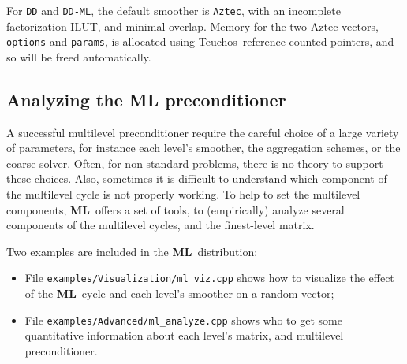 \documentclass{article}[11pt]
\newcommand{\ML}     {{\bf ML}}
\newcommand{\teuchos}  {{\sc Teuchos}}
\begin{document}
For {\tt DD} and {\tt DD-ML}, the default smoother is {\tt Aztec},
with an incomplete factorization ILUT, and minimal overlap. 
Memory for the two {\sc Aztec} vectors, {\tt options} and {\tt params},
is allocated using \teuchos\
reference-counted pointers, and so will be freed automatically.
%


\subsection{Analyzing the ML preconditioner}
\label{sec:MLP:analyze}

A successful multilevel preconditioner require the careful choice
of a large variety of parameters, for instance 
each level's smoother, the aggregation schemes, or the coarse solver.
Often, for non-standard problems, there is no theory to support these choices.
Also, sometimes it is difficult to understand which component of the
multilevel cycle is not properly working. To help to set the multilevel
components, \ML~offers a set of tools, to (empirically)
analyze several components of the multilevel cycles, and the finest-level
matrix.

Two examples are included in the \ML~distribution:
\begin{itemize}
\item File \verb!examples/Visualization/ml_viz.cpp! shows how to
visualize the effect of the \ML~cycle and each level's smoother on a random vector;
\item File \verb!examples/Advanced/ml_analyze.cpp! shows who to
get some quantitative information about each level's matrix, and multilevel preconditioner.
\end{itemize}
\end{document}
